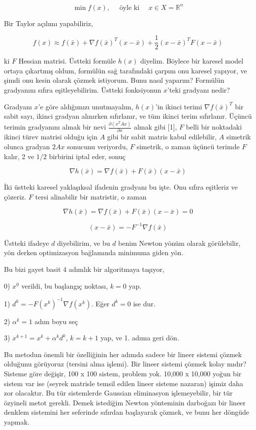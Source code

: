 \documentclass[12pt,fleqn]{article}\usepackage{../../common}
\begin{document}
$$
\min f(x), \quad \textrm{ öyle ki } \quad x \in X = \mathbb{R}^n
$$

Bir Taylor açılımı yapabiliriz,

$$
f(x) \approx 
f(\bar{x}) + 
\nabla f(\bar{x})^T (x-\bar{x}) + 
\frac{1}{2} (x-\bar{x})^T F (x-\bar{x}) 
$$

ki $F$ Hessian matrisi. Üstteki formüle $h(x)$ diyelim. Böylece bir karesel
model ortaya çıkartmış oldum, formülün sağ tarafındaki çarpım onu karesel
yapıyor, ve şimdi onu kesin olarak çözmek istiyorum. Bunu nasıl yaparım?
Formülün gradyanını sıfıra eşitleyebilirim. Üstteki fonksiyonun $x$'teki
gradyanı nedir? 

Gradyanı $x$'e göre aldığımızı unutmayalım, $h(x)$'in ikinci terimi
$\nabla f(\bar{x})^T$ bir sabit sayı, ikinci gradyan alınırken sıfırlanır,
ve tüm ikinci terim sıfırlanır. Üçüncü terimin gradyanını almak bir nevi
$\frac{\partial (x^TAx)}{\partial x} $ almak gibi [1], $F$ belli bir
noktadaki ikinci türev matrisi olduğu için $A$ gibi bir sabit matris kabul
edilebilir, $A$ simetrik olunca gradyan $2Ax$ sonucunu veriyordu, $F$
simetrik, o zaman üçüncü terimde $F$ kalır, 2 ve $1/2$ birbirini iptal
eder, sonuç

$$
\nabla h(\bar{x}) = \nabla f(\bar{x}) + F(\bar{x})(x-\bar{x}) 
$$

İki üstteki karesel yaklaşıksal ifadenin gradyanı bu işte. Onu sıfıra
eşitleriz ve çözeriz. $F$ tersi alinabilir bir matristir, o zaman 

$$
\nabla h(\bar{x}) = \nabla f(\bar{x}) + F(\bar{x})(x-\bar{x}) = 0
$$


$$
(x-\bar{x}) = -F^{-1} \nabla f(\bar{x})
$$
 
Üstteki ifadeye $d$ diyebilirim, ve bu $d$ benim Newton yönüm olarak
görülebilir, yön derken optimizasyon bağlamında minimuma giden yön. 

Bu bizi gayet basit 4 adımlık bir algoritmaya taşıyor,

0) $x^0$ verildi, bu başlangıç noktası, $k = 0$ yap.

1) $d^k = -F(x^k)^{-1} \nabla f(x^k)$. Eğer $d^k=0$ ise dur.

2) $\alpha^k = 1$ adım boyu seç

3) $x^{k+1} = x^k + \alpha^k d^k$, $k = k + 1$ yap, ve 1. adıma geri dön.

Bu metodun önemli bir özelliğinin her adımda sadece bir lineer sistemi
çözmek olduğunu görüyoruz (tersini alma işlemi). Bir lineer sistemi çözmek
kolay mıdır? Sisteme göre değişir, 100 x 100 sistem, problem yok. 10,000 x
10,000 yoğun bir sistem var ise (seyrek matrisle temsil edilen lineer
sisteme nazaran) işimiz daha zor olacaktır. Bu tür sistemlerde Gaussian
eliminasyon işlemeyebilir, bir tür özyineli metot gerekli. Demek istediğim
Newton yönteminin darboğazı bir lineer denklem sistemini her seferinde
sıfırdan başlayarak çözmek, ve bunu her döngüde yapmak.
\end{document}
